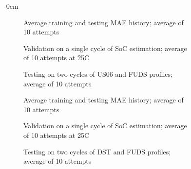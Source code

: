\begin{figure}[H]
    \centering
    \begin{adjustwidth}{-\extralength}{0cm}
    \begin{subfigure}[b]{0.425\textwidth}
        \centering
        
        \caption{Average training and testing MAE history; average of 10 attempts}
    \end{subfigure}
    \hfill
    \begin{subfigure}[b]{0.425\textwidth}
        \centering
        
        \caption{Validation on a single cycle of SoC estimation; average of 10 attempts at 25\textdegree{}C}
    \end{subfigure}
    \hfill
    \begin{subfigure}[b]{0.425\textwidth}
        \centering
        
        \caption{Testing on two cycles of US06 and FUDS profiles; average of 10 attempts}
        \label{subfig:Model-3res-DSTvsFUDS}
    \end{subfigure}
    \begin{subfigure}[b]{0.425\textwidth}
        \centering
        
        \caption{Average training and testing MAE history; average of 10 attempts}
    \end{subfigure}
    \hfill
    \begin{subfigure}[b]{0.425\textwidth}
        \centering
        
        \caption{Validation on a single cycle of SoC estimation; average of 10 attempts at 25\textdegree{}C}
    \end{subfigure}
    \hfill
    \begin{subfigure}[b]{0.425\textwidth}
        \centering
        
        \caption{Testing on two cycles of DST and FUDS profiles; average of 10 attempts}
    \end{subfigure}
    \begin{subfigure}[b]{0.425\textwidth}
        \centering
        

\end{subfigure}
\end{adjustwidth}
\end{figure}
